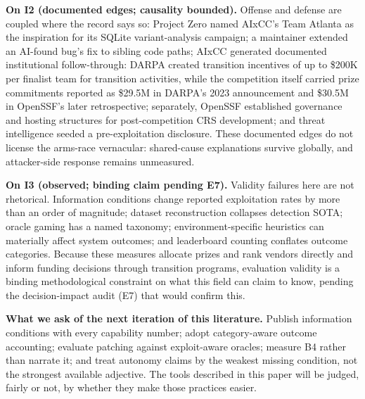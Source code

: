 \documentclass[conference,compsoc]{IEEEtran}
\begin{document}
\textbf{On I2 (documented edges; causality bounded).} Offense and defense are coupled where the
record says so: Project Zero named AIxCC's Team Atlanta as the inspiration for its SQLite
variant-analysis campaign; a maintainer extended an AI-found bug's fix to sibling code paths;
AIxCC generated documented institutional follow-through: DARPA created transition incentives
of up to \$200K per finalist team for transition activities, while the competition itself carried prize commitments reported
as \$29.5M in DARPA's 2023 announcement and \$30.5M in OpenSSF's later retrospective; separately,
OpenSSF established governance and hosting structures for post-competition CRS development; and
threat intelligence seeded a pre-exploitation disclosure. These documented edges do not license
the arms-race vernacular: shared-cause explanations survive globally, and attacker-side
response remains unmeasured.

\appendices
\onecolumn

\textbf{On I3 (observed; binding claim pending E7).} Validity failures here are not rhetorical.
Information conditions change reported exploitation rates by more than an order of magnitude; dataset
reconstruction collapses detection SOTA; oracle gaming has a named taxonomy; environment-specific
heuristics can materially affect system outcomes; and leaderboard counting conflates outcome categories. Because
these measures allocate prizes and rank vendors directly and inform funding
decisions through transition programs, evaluation validity is a binding
methodological constraint on what this field can claim to know, pending the
decision-impact audit (E7) that would confirm this.

\textbf{What we ask of the next iteration of this literature.} Publish information conditions
with every capability number; adopt category-aware outcome accounting; evaluate patching
against exploit-aware oracles; measure B4 rather than narrate it; and treat autonomy claims by
the weakest missing condition, not the strongest available adjective. The tools described in
this paper will be judged, fairly or not, by whether they make those practices easier.

\vspace{6pt}
\end{document}
